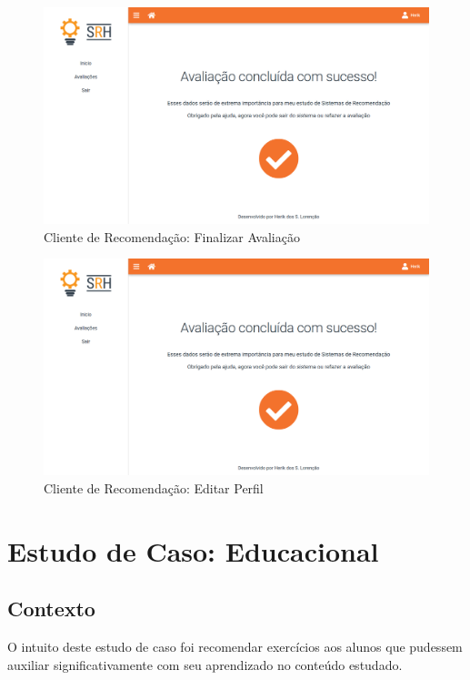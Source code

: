 \begin{figure}[H]
	\centering
	\includegraphics[width=.9\linewidth]{imagens/clientFinalizar.png}
	\caption[Cliente de Recomendação: Finalizar Avaliação]{Cliente de Recomendação: Finalizar Avaliação}
    \label{fig:clienteAvaliacaoFinalizar}
\end{figure}

\begin{figure}[H]
	\centering
	\includegraphics[width=.9\linewidth]{imagens/clientFinalizar.png}
	\caption[Cliente de Recomendação: Editar Perfil]{Cliente de Recomendação: Editar Perfil}
    \label{fig:clienteEditarPerfil}
\end{figure}

\section{Estudo de Caso: Educacional}

\subsection{Contexto}

O intuito deste estudo de caso foi recomendar exercícios aos alunos que pudessem auxiliar significativamente com seu aprendizado no conteúdo estudado.

